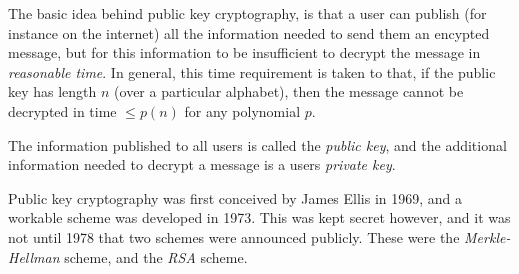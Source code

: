 \documentclass[12pt]{article}
\begin{document}
The basic idea behind public key cryptography, is that a user can publish (for instance on the internet) all the information needed to send them an encypted message, but for this information to be insufficient to decrypt the message in \emph{reasonable time}. In general, this time requirement is taken to  that, if the public key has length $n$ (over a particular alphabet), then the message cannot be decrypted in time $\le p(n)$ for any polynomial $p$.

The information published to all users is called the \emph{public key}, and the additional information needed to decrypt a message is a users \emph{private key}.

Public key cryptography was first conceived by James Ellis in 1969, and a workable scheme was developed in 1973. This was kept secret however, and it was not until 1978 that two schemes were announced publicly. These were the \emph{Merkle-Hellman} scheme, and the \emph{RSA} scheme.
\end{document}
